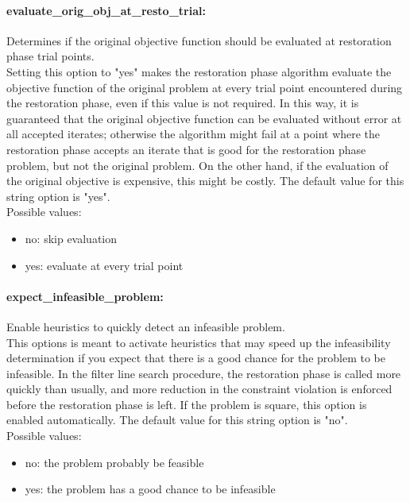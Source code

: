 \paragraph{evaluate\_orig\_obj\_at\_resto\_trial:}\label{sec:evaluate_orig_obj_at_resto_trial} Determines if the original objective function should be evaluated at restoration phase trial points. $\;$ \\
 Setting this option to "yes" makes the
restoration phase algorithm evaluate the
objective function of the original problem at
every trial point encountered during the
restoration phase, even if this value is not
required.  In this way, it is guaranteed that the
original objective function can be evaluated
without error at all accepted iterates; otherwise
the algorithm might fail at a point where the
restoration phase accepts an iterate that is good
for the restoration phase problem, but not the
original problem.  On the other hand, if the
evaluation of the original objective is
expensive, this might be costly.
The default value for this string option is "yes".
\\ 
Possible values:
\begin{itemize}
   \item no: skip evaluation
   \item yes: evaluate at every trial point
\end{itemize}

\paragraph{expect\_infeasible\_problem:}\label{sec:expect_infeasible_problem} Enable heuristics to quickly detect an infeasible problem. $\;$ \\
 This options is meant to activate heuristics that
may speed up the infeasibility determination if
you expect that there is a good chance for the
problem to be infeasible.  In the filter line
search procedure, the restoration phase is called
more quickly than usually, and more reduction in
the constraint violation is enforced before the
restoration phase is left. If the problem is
square, this option is enabled automatically.
The default value for this string option is "no".
\\ 
Possible values:
\begin{itemize}
   \item no: the problem probably be feasible
   \item yes: the problem has a good chance to be infeasible
\end{itemize}

